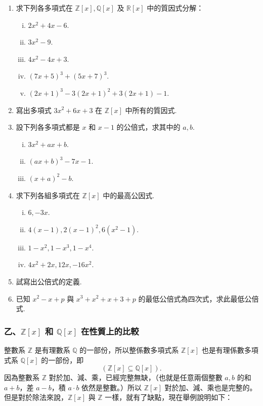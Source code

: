 \begin{enumerate}[1.]
  \item 求下列各多項式在 $\mathbb{Z}[x], \mathbb{Q}[x]$ 及 $\mathbb{R}[x]$ 中的質因式分解：
  \begin{enumerate}[(i)]
    \item $2x^2+4x-6$.
    \item $3x^2-9$.
    \item $4x^2-4x+3$.
    \item $(7x+5)^3+(5x+7)^3$.
    \item $(2x+1)^3-3(2x+1)^2+3(2x+1)-1$.
  \end{enumerate}

  \item 寫出多項式 $3x^2+6x+3$ 在 $\mathbb{Z}[x]$ 中所有的質因式.

  \item 設下列各多項式都是 $x$ 和 $x-1$ 的公倍式，求其中的 $a, b$.
  \begin{enumerate}[(i)]
    \item $3x^2+ax+b$.
    \item $(ax+b)^3-7x-1$.
    \item $(x+a)^2-b$.
  \end{enumerate}

  \item 求下列各組多項式在 $\mathbb{Z}[x]$ 中的最高公因式.
  \begin{enumerate}[(i)]
    \item $6, -3x$.
    \item $4(x-1), 2(x-1)^2, 6(x^2-1)$.
    \item $1-x^2, 1-x^3, 1-x^4$.
    \item $4x^2+2x, 12x, -16x^2$.
  \end{enumerate}

  \item 試寫出公倍式的定義.

  \item 已知 $x^2-x+p$ 與 $x^3+x^2+x+3+p$ 的最低公倍式為四次式，求此最低公倍式.
\end{enumerate}

\subsubsection*{乙、$\mathbb{Z}[x]$ 和 $\mathbb{Q}[x]$ 在性質上的比較}\label{subsec:7-2-b}

整數系 $\mathbb{Z}$ 是有理數系 $\mathbb{Q}$ 的一部份，所以整係數多項式系 $\mathbb{Z}[x]$ 也是有理係數多項式系 $\mathbb{Q}[x]$ 的一部份，即
\begin{equation*}
  (\mathbb{Z}[x] \subseteq \mathbb{Q}[x]).
\end{equation*}
因為整數系 $\mathbb{Z}$ 對於加、減、乘，已經完整無缺，（也就是任意兩個整數 $a, b$ 的和 $a+b$，差 $a-b$，積 $a \cdot b$ 依然是整數。）所以 $\mathbb{Z}[x]$ 對於加、減、乘也是完整的。但是對於除法來說，$\mathbb{Z}[x]$ 與 $\mathbb{Z}$ 一樣，就有了缺點，現在舉例說明如下：

